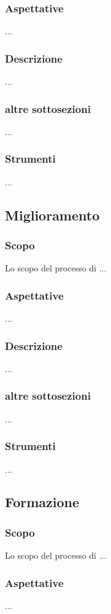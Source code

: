     \subsubsection{Aspettative}
    ...
    \subsubsection{Descrizione}
    ...
    \subsubsection{altre sottosezioni}
    ...
    \subsubsection{Strumenti}
    ...

\subsection{Miglioramento} %
    \subsubsection{Scopo}
    Lo scopo del processo di ...
    \subsubsection{Aspettative}
    ...
    \subsubsection{Descrizione}
    ...
    \subsubsection{altre sottosezioni}
    ...
    \subsubsection{Strumenti}
    ...

\subsection{Formazione} %
    \subsubsection{Scopo}
    Lo scopo del processo di ...
    \subsubsection{Aspettative}
    ...
